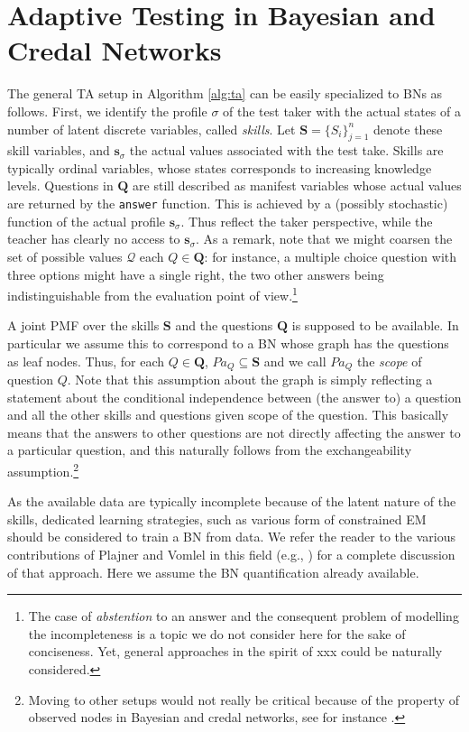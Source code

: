 \documentclass[runningheads]{llncs}
\begin{document}
\section{Adaptive Testing in Bayesian and Credal Networks}\label{sec:bncat}
The general TA setup in Algorithm \ref{alg:ta} can be easily specialized to BNs as follows. First, we identify the profile $\sigma$ of the test taker with the actual states of a number of latent discrete variables, called \emph{skills}. Let $\bm{S}=\{S_i\}_{j=1}^n$ denote these skill variables, and $\bm{s}_\sigma$ the actual values associated with the test take. Skills are typically ordinal variables, whose states corresponds to increasing knowledge levels. Questions in $\bm{Q}$ are still described as manifest variables whose actual values are returned by the {\tt answer} function. This is achieved by a (possibly stochastic) function of the actual profile $\bm{s}_\sigma$. Thus reflect the taker perspective, while the teacher has clearly no access to $\bm{s}_\sigma$. As a remark, note that we might coarsen the set of possible values $\mathcal{Q}$ each $Q\in \bm{Q}$: for instance, a multiple choice question with three options might have a single right, the two other answers being indistinguishable from the evaluation point of view.\footnote{The case of \emph{abstention} to an answer and the consequent problem of modelling the incompleteness is a topic we do not consider here for the sake of conciseness. Yet, general approaches in the spirit of xxx could be naturally considered.} 
 
A joint PMF over the skills $\bm{S}$ and the questions $\bm{Q}$ is supposed to be available. In particular we assume this to correspond to a BN whose graph has the questions as leaf nodes. Thus, for each $Q\in\bm{Q}$, $Pa_Q \subseteq \bm{S}$ and we call $Pa_Q$ the \emph{scope} of question $Q$. Note that this assumption about the graph is simply reflecting a statement about the conditional independence between (the answer to) a question and all the other skills and questions given scope of the question. This basically means that the answers to other questions are not directly affecting the answer to a particular question, and this naturally follows from the exchangeability assumption.\footnote{Moving to other setups would not really be critical because of the property of observed nodes in Bayesian and credal networks, see for instance \cite{antonucci2009,bolt}.}

As the available data are typically incomplete because of the latent nature of the skills, dedicated learning strategies, such as various form of constrained EM should be considered to train a BN from data. We refer the reader to the various contributions of Plajner and Vomlel in this field (e.g., \cite{plajner2020monotonicity}) for a complete discussion of that approach. Here we assume the BN quantification already available.
\end{document}
